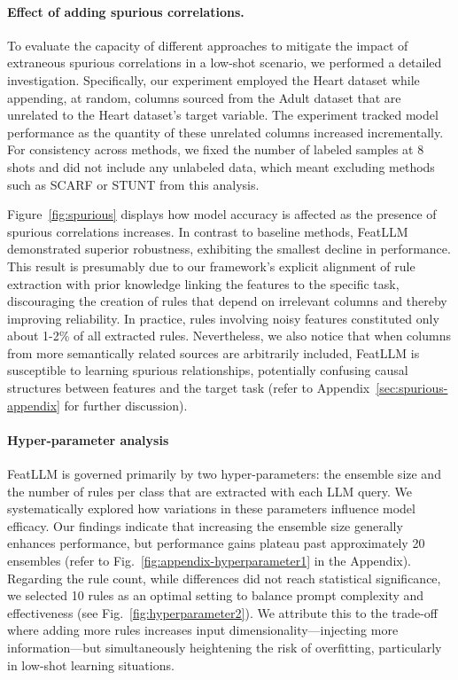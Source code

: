 \paragraph{Effect of adding spurious correlations.} To evaluate the capacity of different approaches to mitigate the impact of extraneous spurious correlations in a low-shot scenario, we performed a detailed investigation. Specifically, our experiment employed the Heart dataset while appending, at random, columns sourced from the Adult dataset that are unrelated to the Heart dataset's target variable. The experiment tracked model performance as the quantity of these unrelated columns increased incrementally. For consistency across methods, we fixed the number of labeled samples at 8 shots and did not include any unlabeled data, which meant excluding methods such as SCARF or STUNT from this analysis. 

Figure~\ref{fig:spurious} displays how model accuracy is affected as the presence of spurious correlations increases. In contrast to baseline methods, \textsf{FeatLLM} demonstrated superior robustness, exhibiting the smallest decline in performance. This result is presumably due to our framework’s explicit alignment of rule extraction with prior knowledge linking the features to the specific task, discouraging the creation of rules that depend on irrelevant columns and thereby improving reliability. In practice, rules involving noisy features constituted only about 1-2\% of all extracted rules. Nevertheless, we also notice that when columns from more semantically related sources are arbitrarily included, \textsf{FeatLLM} is susceptible to learning spurious relationships, potentially confusing causal structures between features and the target task (refer to Appendix~\ref{sec:spurious-appendix} for further discussion).

\vspace*{-0.12in}
\paragraph{Hyper-parameter analysis}
\textsf{FeatLLM} is governed primarily by two hyper-parameters: the ensemble size and the number of rules per class that are extracted with each LLM query. We systematically explored how variations in these parameters influence model efficacy. Our findings indicate that increasing the ensemble size generally enhances performance, but performance gains plateau past approximately 20 ensembles (refer to Fig.~\ref{fig:appendix-hyperparameter1} in the Appendix). Regarding the rule count, while differences did not reach statistical significance, we selected 10 rules as an optimal setting to balance prompt complexity and effectiveness (see Fig.~\ref{fig:hyperparameter2}). We attribute this to the trade-off where adding more rules increases input dimensionality—injecting more information—but simultaneously heightening the risk of overfitting, particularly in low-shot learning situations.

